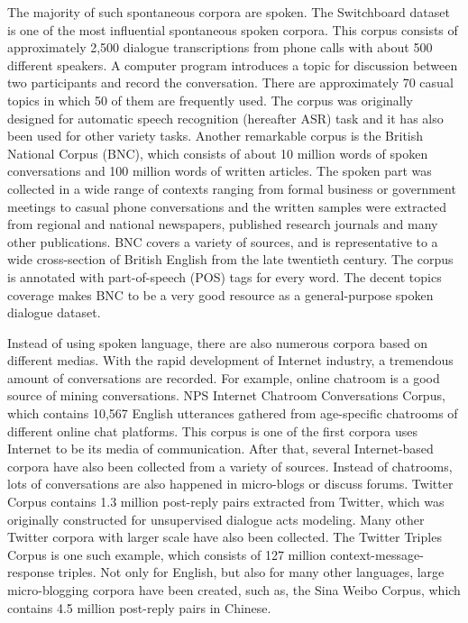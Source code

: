 \documentclass[bsc,frontabs,twoside,singlespacing,parskip,deptreport]{infthesis}     %
\begin{document}
The majority of such spontaneous corpora are spoken. The Switchboard dataset\cite{godfrey1992switchboard} is one of the most influential spontaneous spoken corpora. This corpus consists of approximately 2,500 dialogue transcriptions from phone calls with about 500 different speakers. A computer program introduces a topic for discussion between two participants and record the conversation. There are approximately 70 casual topics in which 50 of them are frequently used. The corpus was originally designed for automatic speech recognition (hereafter ASR) task and it has also been used for other variety tasks. Another remarkable corpus is the British National Corpus\cite{leech1992100} (BNC), which consists of about 10 million words of spoken conversations and 100 million words of written articles. The spoken part was collected in a wide range of contexts ranging from formal business or government meetings to casual phone conversations and the written samples were extracted from regional and national newspapers, published research journals and many other publications. BNC covers a variety of sources, and is representative to a wide cross-section of British English from the late twentieth century. The corpus is annotated with part-of-speech (POS) tags for every word. The decent topics coverage makes BNC to be a very good resource as a general-purpose spoken dialogue dataset. 

Instead of using spoken language, there are also numerous corpora based on different medias. With the rapid development of Internet industry, a tremendous amount of conversations are recorded. For example, online chatroom is a good source of mining conversations. NPS Internet Chatroom Conversations Corpus\cite{forsythand2007lexical}, which contains 10,567 English utterances gathered from age-specific chatrooms of different online chat platforms. This corpus is one of the first corpora uses Internet to be its media of communication. After that, several Internet-based corpora have also been collected from a variety of sources. Instead of chatrooms, lots of conversations are also happened in micro-blogs or discuss forums. Twitter Corpus\cite{ritter2010unsupervised} contains 1.3 million post-reply pairs extracted from Twitter, which was originally constructed for unsupervised dialogue acts modeling. Many other Twitter corpora with larger scale have also been collected. The Twitter Triples Corpus\cite{sordoni2015neural} is one such example, which consists of 127 million context-message-response triples. Not only for English, but also for many other languages, large micro-blogging corpora have been created, such as, the Sina Weibo Corpus\cite{shang2015neural}, which contains 4.5 million post-reply pairs in Chinese.
\end{document}
